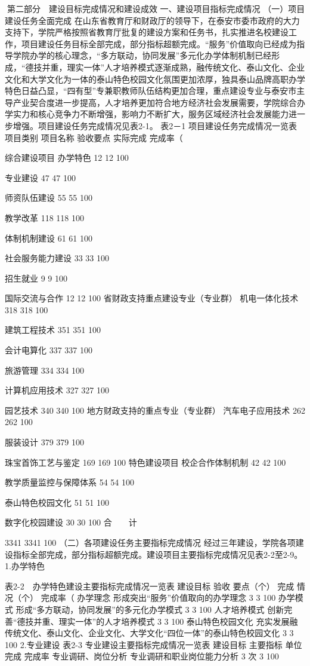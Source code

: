 第二部分　建设目标完成情况和建设成效
一、建设项目指标完成情况
（一）项目建设任务全面完成
在山东省教育厅和财政厅的领导下，在泰安市委市政府的大力支持下，学院严格按照省教育厅批复的建设方案和任务书，扎实推进名校建设工作，项目建设任务目标全部完成，部分指标超额完成。“服务”价值取向已经成为指导学院办学的核心理念，“多方联动，协同发展”多元化办学体制机制已经形成，“德技并重，理实一体”人才培养模式逐渐成熟，融传统文化、泰山文化、企业文化和大学文化为一体的泰山特色校园文化氛围更加浓厚，独具泰山品牌高职办学特色日益凸显，“四有型”专兼职教师队伍结构更加合理，重点建设专业与泰安市主导产业契合度进一步提高，人才培养更加符合地方经济社会发展需要，学院综合办学实力和核心竞争力不断增强，影响力不断扩大，服务区域经济社会发展能力进一步增强。项目建设任务完成情况见表2-1。
表2－1 项目建设任务完成情况一览表
项目类别
项目名称
验收要点
实际完成
完成率（%




综合建设项目
办学特色
12
12
100%

专业建设
47
47
100%

师资队伍建设
55
55
100%

教学改革
118
118
100%

体制机制建设
61
61
100%

社会服务能力建设
33
33
100%

招生就业
9
9
100%

国际交流与合作
12
12
100%
省财政支持重点建设专业（专业群）
机电一体化技术
318
318
100%

建筑工程技术
351
351
100%

会计电算化
337
337
100%

旅游管理
334
334
100%

计算机应用技术
327
327
100%

园艺技术
340
340
100%
地方财政支持的重点专业（专业群）
汽车电子应用技术
262
262
100%

服装设计
379
379
100%

珠宝首饰工艺与鉴定
169
169
100%
特色建设项目
校企合作体制机制
42
42
100%

教学质量监控与保障体系
54
54
100%

泰山特色校园文化
51
51
100%

数字化校园建设
30
30
100%
合　　计

3341
3341
100%
（二）各项建设任务主要指标完成情况
经过三年建设，学院各项建设指标全部完成，部分指标超额完成。建设项目主要指标完成情况见表2-2至2-9。
1.办学特色






表2-2　办学特色建设主要指标完成情况一览表
建设目标
验收
要点（个）
完成
情况（个）
完成率（%
办学理念
形成突出“服务”价值取向的办学理念
3
3
100%
办学模式
形成“多方联动，协同发展”的多元化办学模式
3
3
100%
人才培养模式
创新完善“德技并重、理实一体”的人才培养模式
3
3
100%
泰山特色校园文化
充实发展融传统文化、泰山文化、企业文化、大学文化“四位一体”的泰山特色校园文化
3
3
100%
2.专业建设
表2-3  专业建设主要指标完成情况一览表
建设目标
主要指标
单位
完成
完成率
专业调研、岗位分析
专业调研和职业岗位能力分析
3
次
3
100%

